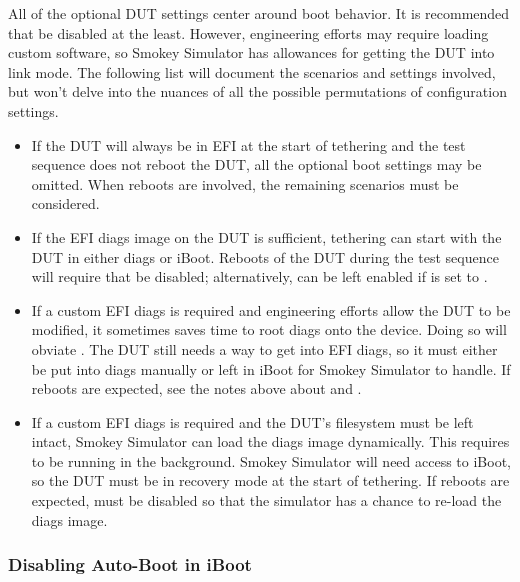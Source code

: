 All of the optional DUT settings center around boot behavior.  It is
recommended that  be disabled at the least.  However,
engineering efforts may require loading custom software, so Smokey Simulator
has allowances for getting the DUT into link mode.  The following list will
document the scenarios and settings involved, but won't delve into the nuances
of all the possible permutations of configuration settings.

\begin{itemize}

	\item If the DUT will always be in EFI at the start of tethering and
	the test sequence does not reboot the DUT, all the optional boot
	settings may be omitted.  When reboots are involved, the remaining
	scenarios must be considered.

	\item If the EFI diags image on the DUT is sufficient, tethering can
	start with the DUT in either diags or iBoot.  Reboots of the DUT during
	the test sequence will require that  be disabled;
	alternatively,  can be left enabled if
	 is set to .

	\item If a custom EFI diags is required and engineering efforts allow
	the DUT to be modified, it sometimes saves time to root diags onto the
	device.  Doing so will obviate .  The DUT still needs
	a way to get into EFI diags, so it must either be put into diags
	manually or left in iBoot for Smokey Simulator to handle.  If reboots
	are expected, see the notes above about  and
	.

	\item If a custom EFI diags is required and the DUT's filesystem must
	be left intact, Smokey Simulator can load the diags image dynamically.
	This requires  to be running in the background.
	Smokey Simulator will need access to iBoot, so the DUT must be in
	recovery mode at the start of tethering.  If reboots are expected,
	 must be disabled so that the simulator has a chance
	to re-load the diags image.

\end{itemize}

\subsubsection{Disabling Auto-Boot in iBoot}

